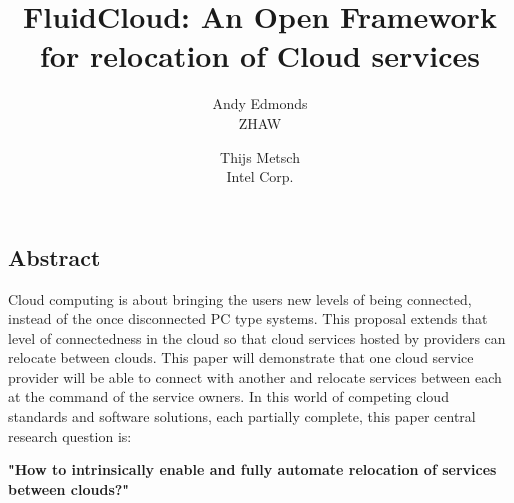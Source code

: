 \documentclass[letterpaper,twocolumn,10pt]{article}
\begin{document}
\date{}

\title{\Large \bf FluidCloud: An Open Framework for relocation of Cloud services}

\author{
{\rm Andy Edmonds}\\
ZHAW
\and
{\rm Thijs Metsch}\\
Intel Corp.
}

\maketitle

\thispagestyle{empty}

\subsection*{Abstract}
Cloud computing is about bringing the users new levels of being connected, 
instead of the once disconnected PC type systems.  This proposal extends 
that level of connectedness in the cloud so that cloud services hosted by 
providers can relocate between clouds. This paper will demonstrate 
that one cloud service provider will be able to connect with another and 
relocate services between each at the command of the service owners.
In this world of competing cloud standards and software solutions, each 
partially complete, this paper central research question is:

\textbf{"How to intrinsically enable and fully automate relocation of services 
between clouds?"}
\end{document}
